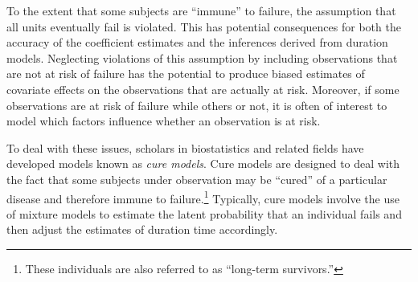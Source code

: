 To the extent that some subjects are “immune” to failure, the assumption that all units eventually fail is violated. This has potential consequences for both the accuracy of the coefficient estimates and the inferences derived from duration models. Neglecting violations of this assumption by including observations that are not at risk of failure has the potential to produce biased estimates of covariate effects on the observations that are actually at risk. Moreover, if some observations are at risk of failure while others or not, it is often of interest to model which factors influence whether an observation is at risk.


To deal with these issues, scholars in biostatistics and related fields have developed models known as \textit{cure models}. Cure models are designed to deal with the fact that some subjects under observation may be ``cured'' of a particular disease and therefore immune to failure.\footnote{These individuals are also referred to as ``long-term survivors.''} Typically, cure models involve the use of mixture models to estimate the latent probability that an individual fails and then adjust the estimates of duration time accordingly. 

